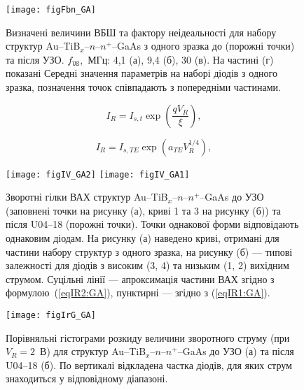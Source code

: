 \documentclass[a4paper,14pt,oneside,openany]{memoir}
\begin{document}
\begin{figure}
\center
\texttt{[image: figFbn\_GA]}%
\caption{\label{figFbn_GA}
Визначені величини ВБШ та фактору неідеальності для набору структур Au--TiB$_x$--$n$--$n^+$--GaAs
з одного зразка до (порожні точки) та після УЗО.
$f_\mathtt{US}$,~МГц: 4,1 (а), 9,4 (б), 30 (в).
На частині (г) показані Середні значення параметрів на наборі діодів з одного зразка,
позначення точок співпадають з попередніми частинами.
}
\end{figure}


\begin{equation}\label{eqIR1:GA}
I_R=I_{s,t}\exp\left(\frac{qV_R}{\xi}\right),
\end{equation}

\begin{equation}\label{eqIR2:GA}
I_R=I_{s,TE}\exp\left(a_{TE}V_R^{1/4}\right),
\end{equation}



\begin{figure}
\center
\texttt{[image: figIV\_GA2]} \hfill
\texttt{[image: figIV\_GA1]}
\caption{\label{figIV_GA}
Зворотні гілки ВАХ структур Au--TiB$_x$--$n$--$n^+$--GaAs
до УЗО (заповнені точки на рисунку (а), криві 1 та 3 на рисунку (б))
та після U04--18 (порожні точки).
Точки однакової форми відповідають однаковим діодам.
На рисунку (а) наведено криві, отримані для частини набору структур з одного зразка,
на рисунку (б) --- типові залежності для діодів з високим (3, 4) та низьким (1, 2)
вихідним струмом.
Суцільні лінії --- апроксимація частини ВАХ згідно з формулою~(\ref{eqIR2:GA}),
пунктирні  --- згідно з (\ref{eqIR1:GA}).
}%
\end{figure}


\begin{figure}
\center
\texttt{[image: figIrG\_GA]}%
\caption{\label{figIrG_GA}
Порівняльні гістограми розкиду величини зворотного струму (при $V_R=2$~В)
для структур Au--TiB$_x$--$n$--$n^+$--GaAs до УЗО (а) та після U04--18 (б).
По вертикалі відкладена частка діодів, для яких струм знаходиться у відповідному діапазоні.
}
\end{figure}
\end{document}
